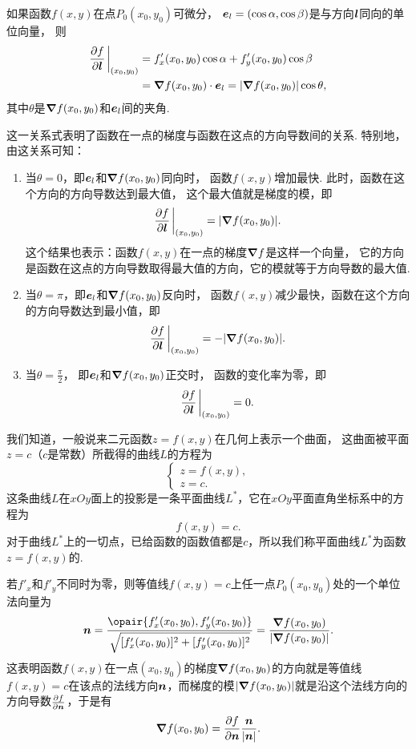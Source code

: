 \begin{theorem}\label{theorem:多元函数微分法.方向导数与梯度的关系}
如果函数\(f(x,y)\)在点\(P_0(x_0,y_0)\)可微分，
\(\boldsymbol{e}_l=(\cos\alpha,\cos\beta)\)是与方向\(\boldsymbol{l}\)同向的单位向量，
则\begin{equation}
	\begin{split}
		\pdv{f}{\mat{l}}\eval_{(x_0,y_0)}
		&= f'_x(x_0,y_0) \cos\alpha + f'_y(x_0,y_0) \cos\beta \\
		&= \grad f(x_0,y_0) \cdot \mat{e}_l
		= \abs{\grad f(x_0,y_0)} \cos\theta,
	\end{split}
\end{equation}
其中\(\theta\)是\(\grad f(x_0,y_0)\)和\(\boldsymbol{e}_l\)间的夹角.
\end{theorem}
这一关系式表明了函数在一点的梯度与函数在这点的方向导数间的关系.
特别地，由这关系可知：
\begin{enumerate}
	\item 当\(\theta=0\)，即\(\boldsymbol{e}_l\)和\(\grad f(x_0,y_0)\)同向时，
	函数\(f(x,y)\)增加最快.
	此时，函数在这个方向的方向导数达到最大值，
	这个最大值就是梯度的模，即\[
		\pdv{f}{\mat{l}}\eval_{(x_0,y_0)} = \abs{\grad f(x_0,y_0)}.
	\]
	这个结果也表示：函数\(f(x,y)\)在一点的梯度\(\grad f\)是这样一个向量，
	它的方向是函数在这点的方向导数取得最大值的方向，它的模就等于方向导数的最大值.

	\item 当\(\theta=\pi\)，即\(\boldsymbol{e}_l\)和\(\grad f(x_0,y_0)\)反向时，
	函数\(f(x,y)\)减少最快，函数在这个方向的方向导数达到最小值，即\[
		\pdv{f}{\mat{l}}\eval_{(x_0,y_0)} = -\abs{\grad f(x_0,y_0)}.
	\]

	\item 当\(\theta=\frac{\pi}{2}\)，
	即\(\boldsymbol{e}_l\)和\(\grad f(x_0,y_0)\)正交时，
	函数的变化率为零，即\[
		\pdv{f}{\mat{l}}\eval_{(x_0,y_0)} = 0.
	\]
\end{enumerate}

我们知道，一般说来二元函数\(z = f(x,y)\)在几何上表示一个曲面，
这曲面被平面\(z = c\)（\(c\)是常数）所截得的曲线\(L\)的方程为\[
\left\{ \begin{array}{l}
z = f(x,y), \\
z = c.
\end{array} \right.
\]这条曲线\(L\)在\(xOy\)面上的投影是一条平面曲线\(L^*\)，它在\(xOy\)平面直角坐标系中的方程为\[
f(x,y) = c.
\]对于曲线\(L^*\)上的一切点，已给函数的函数值都是\(c\)，所以我们称平面曲线\(L^*\)为函数\(z = f(x,y)\)的.

若\(f'_x\)和\(f'_y\)不同时为零，则等值线\(f(x,y) = c\)上任一点\(P_0(x_0,y_0)\)处的一个单位法向量为\[
\mat{n}
= \frac{\opair{f'_x(x_0,y_0),f'_y(x_0,y_0)}}{\sqrt{[f'_x(x_0,y_0)]^2+[f'_y(x_0,y_0)]^2}}
= \frac{\grad f(x_0,y_0)}{\abs{\grad f(x_0,y_0)}}.
\]
这表明函数\(f(x,y)\)在一点\((x_0,y_0)\)的梯度\(\grad f(x_0,y_0)\)的方向就是等值线\(f(x,y) = c\)在该点的法线方向\(\boldsymbol{n}\)，而梯度的模\(\abs{\grad f(x_0,y_0)}\)就是沿这个法线方向的方向导数\(\pdv{f}{\boldsymbol{n}}\)，于是有\[
\grad f(x_0,y_0) = \pdv{f}{\boldsymbol{n}} \frac{\boldsymbol{n}}{\abs{\boldsymbol{n}}}.
\]


